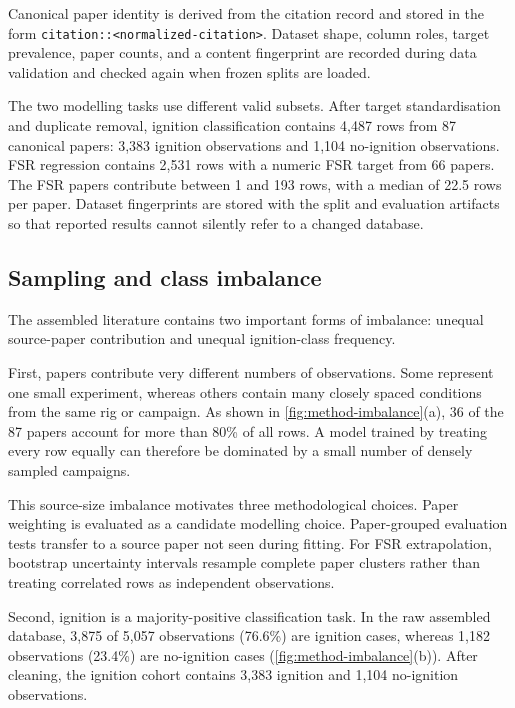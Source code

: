 Canonical paper identity is derived from the citation record and stored in the
form \texttt{citation::<normalized-citation>}. Dataset shape, column roles,
target prevalence, paper counts, and a content fingerprint are recorded during
data validation and checked again when frozen splits are loaded.

The two modelling tasks use different valid subsets. After target
standardisation and duplicate removal, ignition classification contains 4,487
rows from 87 canonical papers: 3,383 ignition observations and 1,104
no-ignition observations. FSR regression contains 2,531 rows with a numeric
FSR target from 66 papers. The FSR papers contribute between 1 and 193 rows,
with a median of 22.5 rows per paper. Dataset fingerprints are stored with the
split and evaluation artifacts so that reported results cannot silently refer
to a changed database.

\subsection{Sampling and class imbalance}
\label{sec:method-imbalance}

The assembled literature contains two important forms of imbalance: unequal
source-paper contribution and unequal ignition-class frequency.

First, papers contribute very different numbers of observations. Some represent
one small experiment, whereas others contain many closely spaced conditions
from the same rig or campaign. As shown in \cref{fig:method-imbalance}(a), 36
of the 87 papers account for more than 80\% of all rows. A model trained by
treating every row equally can therefore be dominated by a small number of
densely sampled campaigns.

This source-size imbalance motivates three methodological choices. Paper
weighting is evaluated as a candidate modelling choice. Paper-grouped
evaluation tests transfer to a source paper not seen during fitting. For FSR
extrapolation, bootstrap uncertainty intervals resample complete paper clusters
rather than treating correlated rows as independent observations.

Second, ignition is a majority-positive classification task. In the raw
assembled database, 3,875 of 5,057 observations (76.6\%) are ignition cases,
whereas 1,182 observations (23.4\%) are no-ignition cases
(\cref{fig:method-imbalance}(b)). After cleaning, the ignition cohort contains
3,383 ignition and 1,104 no-ignition observations.


